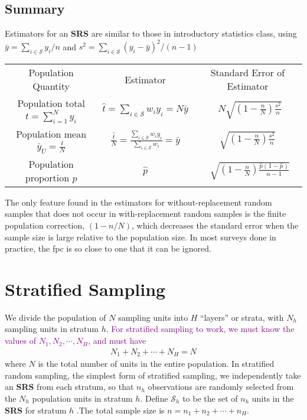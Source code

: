 \documentclass[a4paper,twoside,11pt]{article}
\begin{document}
\subsection{Summary}
Estimators for an \textbf{SRS} are similar to those in introductory statistics class, using $\bar{y} = \sum_{i \in \mathcal{S}} y_i /n$ and $s^2 = \sum_{i \in \mathcal{S}} (y_i - \bar{y})^2/(n-1)$
\begin{center}
\begin{tabular}{ c| c| c} 
 \hline
Population Quantity & Estimator & Standard Error of Estimator\\
Population total $t = \sum^N_{i=1} y_i$ & $\hat{t} = \sum_{i \in \mathcal{S}} w_i y_i = N \bar{y}$ & \ $N \sqrt{(1-\frac{n}{N})\frac{s^2}{n}}$ \\
Population mean $\bar{y}_U = \frac{t}{N}$ & $\frac{\hat{t}}{N} = \frac{\sum_{i \in \mathcal{S}}w_iy_i}{\sum_{i \in \mathcal{S}}w_i}= \bar{y}$ & $\sqrt{(1-\frac{n}{N})\frac{s^2}{n}}$ \\
Population proportion $p$ & $\hat{p}$ & \ $\sqrt{(1-\frac{n}{N})\frac{\hat{p}(1-\hat{p})}{n-1}}$ \\
 \hline
\end{tabular}
\end{center}
The only feature found in the estimators for without-replacement random samples that does not occur in with-replacement random samples is the finite population correction, $(1-n/N)$, which decreases the standard error when the sample size is large relative to the population size. In most surveys done in practice, the fpc is so close to one that it can be ignored.
\section{Stratified Sampling}
We divide the population of $N$ sampling units into $H$ “layers” or strata, with $N_h$ sampling units in stratum $h$. \textcolor{Purple}{For stratified sampling to work, we must know the values of $N_1,N_2,\cdots, N_H$, and must have}
\begin{equation*}
\begin{aligned}
N_1 + N_2 + \cdots + N_H = N
\end{aligned}
\end{equation*}
where $N$ is the total number of units in the entire population.
\newline
\newline
In stratified random sampling, the simplest form of stratified sampling, we independently take an \textbf{SRS} from each stratum, so that $n_h$ observations are randomly selected from the $N_h$ population units in stratum $h$. Define $\mathcal{S}_h$ to be the set of $n_h$ units in the \textbf{SRS} for stratum $h$ .The total sample size is $n=n_1+n_2+\cdots +n_H$.
\end{document}
